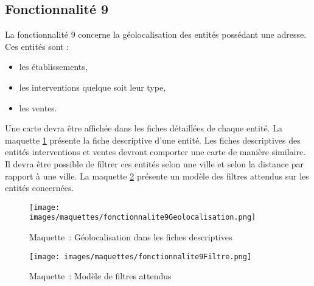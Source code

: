 \subsection{Fonctionnalité 9}

La fonctionnalité 9 concerne la géolocalisation des entités possédant une adresse.
Ces entités sont : 
\begin{itemize}
\item les établissements,
\item les interventions quelque soit leur type,
\item les ventes.
\end{itemize}
Une carte devra être affichée dans les fiches détaillées de chaque entité.
La maquette \ref{fonctionnalite9Geolocalisation} présente la fiche descriptive d'une entité. Les fiches descriptives
des entités interventions et ventes devront comporter une carte de manière similaire.
Il devra être possible de filtrer ces entités selon une ville et selon la distance par rapport à une ville.
La maquette \ref{fonctionnalite9Filtre} présente un modèle des filtres attendus sur les entités concernées.

\begin{figure}[H]
	\centering
	\texttt{[image: images/maquettes/fonctionnalite9Geolocalisation.png]}
	 \caption{Maquette~: Géolocalisation dans les fiches descriptives}
	 \label{fonctionnalite9Geolocalisation}
\end{figure}

\begin{figure}[H]
	\centering
	\texttt{[image: images/maquettes/fonctionnalite9Filtre.png]}
	 \caption{Maquette~: Modèle de filtres attendus}
	 \label{fonctionnalite9Filtre}
\end{figure}
